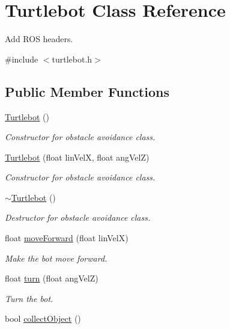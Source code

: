 \hypertarget{classTurtlebot}{}\section{Turtlebot Class Reference}
\label{classTurtlebot}


Add R\+OS headers.  




{\ttfamily \#include $<$turtlebot.\+h$>$}

\subsection*{Public Member Functions}
\begin{DoxyCompactItemize}
\item 
\hyperlink{classTurtlebot_a683061fc512bfb8d2a35134e783767ff}{Turtlebot} ()
\begin{DoxyCompactList}\small\item\em Constructor for obstacle avoidance class. \end{DoxyCompactList}\item 
\hyperlink{classTurtlebot_a5c5d2e07560cf7dd661fa5c16b56f486}{Turtlebot} (float lin\+VelX, float ang\+VelZ)
\begin{DoxyCompactList}\small\item\em Constructor for obstacle avoidance class. \end{DoxyCompactList}\item 
\hyperlink{classTurtlebot_a86b905efdcfab4dc1d4c9f7687902f94}{$\sim$\+Turtlebot} ()
\begin{DoxyCompactList}\small\item\em Destructor for obstacle avoidance class. \end{DoxyCompactList}\item 
float \hyperlink{classTurtlebot_ab55e08a3b52c24ef094f591b8945a0e9}{move\+Forward} (float lin\+VelX)
\begin{DoxyCompactList}\small\item\em Make the bot move forward. \end{DoxyCompactList}\item 
float \hyperlink{classTurtlebot_a793fbcacdfb213d377d3d12e38957a88}{turn} (float ang\+VelZ)
\begin{DoxyCompactList}\small\item\em Turn the bot. \end{DoxyCompactList}\item 
bool \hyperlink{classTurtlebot_a7aa654d1ae90e2e380c3d46d2fd17a71}{collect\+Object} ()

\end{DoxyCompactItemize}
